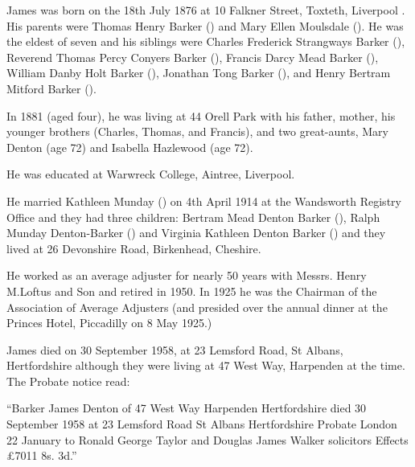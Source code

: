 
James was born on the 18th July 1876 at 10 Falkner Street, Toxteth, Liverpool \cite{JamesDBarkerBirth}. His parents were Thomas Henry Barker () and Mary Ellen Moulsdale (). He was the eldest of seven and his siblings were Charles Frederick Strangways Barker (),  Reverend Thomas Percy Conyers Barker (), Francis Darcy Mead Barker (), William Danby Holt Barker (), Jonathan Tong Barker (), and Henry Bertram Mitford Barker ().

In 1881 (aged four), he was living at 44 Orell Park with his father, mother, his younger brothers (Charles, Thomas, and Francis), and two great-aunts, Mary Denton (age 72) and Isabella Hazlewood (age 72).\cite{UKCensusRG11_3688}

He was educated at Warwreck College, Aintree, Liverpool.

He married Kathleen Munday () on 4th April 1914 at the Wandsworth Registry Office \cite{JamesDBarkerMarriage} and they had three children: Bertram Mead Denton Barker (), Ralph Munday Denton-Barker () and Virginia Kathleen Denton Barker ()  and they lived at 26 Devonshire Road, Birkenhead, Cheshire.

He worked as an average adjuster for nearly 50 years with Messrs. Henry M.Loftus and Son and retired in 1950. In 1925 he was the Chairman of the Association of Average Adjusters (and presided over the annual dinner at the Princes Hotel, Piccadilly on 8 May 1925.)

James died on 30 September 1958, at 23 Lemsford Road, St Albans, Hertfordshire \cite{JamesDBarkerDeath} although they were living at 47 West Way, Harpenden at the time. The Probate notice read:

``Barker James Denton of 47 West Way Harpenden Hertfordshire died 30 September 1958 at 23 Lemsford Road St Albans Hertfordshire Probate London 22 January to Ronald George Taylor and Douglas James Walker solicitors Effects £7011 8s. 3d.''
